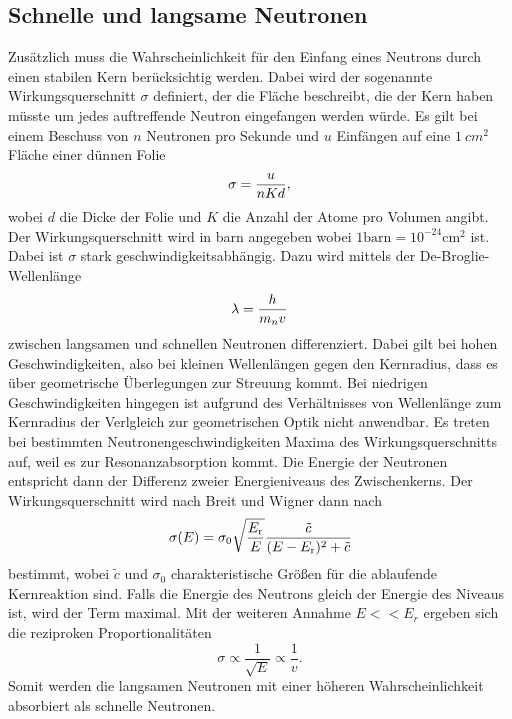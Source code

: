 \subsection{Schnelle und langsame Neutronen}
Zusätzlich muss die Wahrscheinlichkeit für den Einfang eines Neutrons durch einen stabilen Kern berücksichtig werden.
Dabei wird der sogenannte Wirkungsquerschnitt $\sigma$ definiert, der die Fläche beschreibt, die der Kern haben müsste um jedes auftreffende Neutron eingefangen werden würde.
Es gilt bei einem Beschuss von $n$ Neutronen pro Sekunde und $u$ Einfängen auf eine $\SI{1}{cm^2}$ Fläche einer dünnen Folie 
\begin{equation}
    \sigma = \frac{u}{n K d},    \notag
\end{equation} 
wobei $d$ die Dicke der Folie und $K$ die Anzahl der Atome pro Volumen angibt.
Der Wirkungsquerschnitt wird in barn angegeben wobei $1\text{barn} = 10^{-24}\text{cm}^2$ ist.
Dabei ist $\sigma$ stark geschwindigkeitsabhängig.
Dazu wird mittels der De-Broglie-Wellenlänge
\begin{equation}
    \lambda = \frac{h}{m_n v}   \notag
\end{equation}
zwischen langsamen und schnellen Neutronen differenziert.
Dabei gilt bei hohen Geschwindigkeiten, also bei kleinen Wellenlängen gegen den Kernradius, dass es über geometrische Überlegungen zur Streuung kommt.
Bei niedrigen Geschwindigkeiten hingegen ist aufgrund des Verhältnisses von Wellenlänge zum Kernradius der Verlgleich zur geometrischen Optik nicht anwendbar.
Es treten bei bestimmten Neutronengeschwindigkeiten Maxima des Wirkungsquerschnitts auf, weil es zur Resonanzabsorption kommt.
Die Energie der Neutronen entspricht dann der Differenz zweier Energieniveaus des Zwischenkerns.
Der Wirkungsquerschnitt wird nach Breit und Wigner dann nach
\begin{equation}
    \sigma (E) = \sigma_0 \sqrt{\frac{E_\text{r}}{E}} \frac{\tilde{c}}{(E-E_\text{r})^2 + \tilde{c}}    \notag
\end{equation}
bestimmt, wobei $\tilde{c}$ und $\sigma_0$ charakteristische Grö\ss{}en für die ablaufende Kernreaktion sind.
Falls die Energie des Neutrons gleich der Energie des Niveaus ist, wird der Term maximal.
Mit der weiteren Annahme $E<<E_r$ ergeben sich die reziproken Proportionalitäten
\begin{equation}
    \sigma \propto \frac{1}{\sqrt{E}} \propto \frac{1}{v}.
\end{equation}
Somit werden die langsamen Neutronen mit einer höheren Wahrscheinlichkeit absorbiert als schnelle Neutronen.

